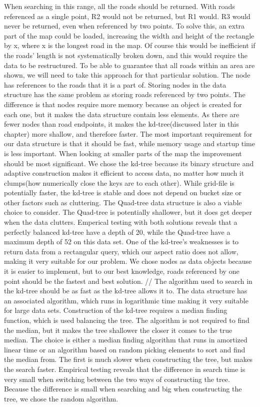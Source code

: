\documentclass[a4paper,10pt,titlepage]{article}
\begin{document}
 When searching in this range, all the roads should be returned. With roads referenced as a single point, R2 would not be returned, but R1 would. R3 would never be returned, even when referenced by two points. To solve this, an extra part of the map could be loaded, increasing the width and height of the rectangle by x, where x is the longest road in the map. Of course this would be inefficient if the roads’ length is not systematically broken down, and this would require the data to be restructured. To be able to guarantee that all roads within an area are shown, we will need to take this approach for that particular solution.
The node has references to the roads that it is a part of. Storing nodes in the data structure has the same problem as storing roads referenced by two points. The difference is that nodes require more memory because an object is created for each one, but it makes the data structure contain less elements. As there are fewer nodes than road endpoints, it makes the kd-tree(discussed later in this chapter) more shallow, and therefore faster. 
The most important requirement for our data structure is that it should be fast, while memory usage and startup time is less important. When looking at smaller parts of the map the improvement should be most significant. We chose the kd-tree because its binary structure and adaptive construction makes it efficient to access data, no matter how much it clumps(how numerically close the keys are to each other). While grid-file is potentially faster, the kd-tree is stable and does not depend on bucket size or other factors such as cluttering.  The Quad-tree data structure is also a viable choice to consider. The Quad-tree is potentially shallower, but it does get deeper when the data clutters. Emperical testing with both solutions reveals that a perfectly balanced kd-tree have a depth of 20, while the Quad-tree have a maximum depth of 52 on this data set. One of the kd-tree’s weaknesses is to return data from a rectangular query, which our aspect ratio does not allow, making it very suitable for our problem. We chose nodes as data objects because it is easier to implement, but to our best knowledge, roads referenced by one point should be the fastest and best solution.
//
The algorithm used to search in the kd-tree should be as fast as the kd-tree allows it to. The data structure has an associated algorithm, which runs in logarithmic time making it very suitable for large data sets.
Construction of the kd-tree requires a median finding function, which is used balancing the tree. The algorithm is not required to find the median, but it makes the tree shallower the closer it comes to the true median. The choice is either a median finding algorithm that runs in amortized linear time or an algorithm based on random picking elements to sort and find the median from. The first is much slower when constructing the tree, but makes the search faster. Empirical testing reveals that the difference in search time is very small when switching between the two ways of constructing the tree. Because the difference is small when searching and big when constructing the tree, we chose the random algorithm.
\end{document}
